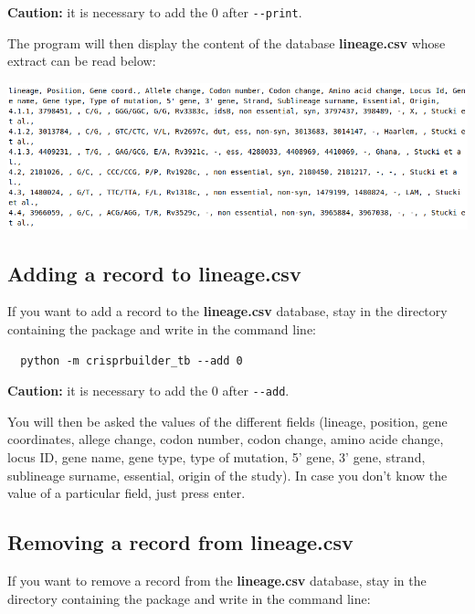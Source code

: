 \documentclass[twoside,a4paper,11pt,frenchb,openany]{report}
\begin{document}
    \textbf{Caution:} it is necessary to add the 0 after \texttt{-\/-print}.

The program will then display the content of the database
\textbf{lineage.csv} whose extract can be read below:

\includegraphics[width=16cm]{img_01.png}



    \subsection{Adding a record to
lineage.csv}\label{adding-a-record-to-lineage.csv}

    If you want to add a record to the \textbf{lineage.csv} database, stay
in the directory containing the package and write in the command line:

    \begin{verbatim}
  python -m crisprbuilder_tb --add 0
\end{verbatim}

    \textbf{Caution:} it is necessary to add the 0 after \texttt{-\/-add}.

You will then be asked the values of the different fields (lineage,
position, gene coordinates, allege change, codon number, codon change,
amino acide change, locus ID, gene name, gene type, type of mutation, 5'
gene, 3' gene, strand, sublineage surname, essential, origin of the
study). In case you don't know the value of a particular field, just
press enter.



    \subsection{Removing a record from
lineage.csv}\label{removing-a-record-from-lineage.csv}

    If you want to remove a record from the \textbf{lineage.csv} database,
stay in the directory containing the package and write in the command
line:
\end{document}
